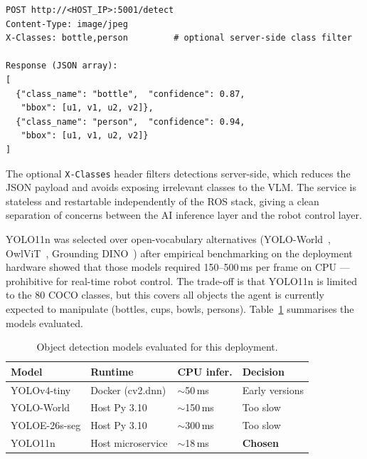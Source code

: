 \begin{lstlisting}[language={}, numbers=none,
    caption={YOLO11n microservice HTTP interface (port 5001).}]
POST http://<HOST_IP>:5001/detect
Content-Type: image/jpeg
X-Classes: bottle,person         # optional server-side class filter

Response (JSON array):
[
  {"class_name": "bottle",  "confidence": 0.87,
   "bbox": [u1, v1, u2, v2]},
  {"class_name": "person",  "confidence": 0.94,
   "bbox": [u1, v1, u2, v2]}
]
\end{lstlisting}

The optional \texttt{X-Classes} header filters detections server-side, which
reduces the JSON payload and avoids exposing irrelevant classes to the VLM.
The service is stateless and restartable independently of the ROS stack, giving
a clean separation of concerns between the AI inference layer and the robot
control layer.

\begin{sloppypar}
YOLO11n was selected over open-vocabulary alternatives
(YOLO-World~\cite{cheng2024yoloworld}, OwlViT~\cite{minderer2022owlvit},
Grounding DINO~\cite{liu2023gdino}) after empirical benchmarking on the
deployment hardware showed that those models required 150--500\,ms per frame
on CPU --- prohibitive for real-time robot control.
The trade-off is that YOLO11n is limited to the 80 COCO classes, but this
covers all objects the agent is currently expected to manipulate (bottles,
cups, bowls, persons).
Table~\ref{tab:yolo_micro} summarises the models evaluated.
\end{sloppypar}

\begin{table}[H]
\centering
\caption{Object detection models evaluated for this deployment.}
\label{tab:yolo_micro}
\small
\begin{tabular}{llll}
\toprule
\textbf{Model} & \textbf{Runtime} & \textbf{CPU infer.} & \textbf{Decision} \\
\midrule
YOLOv4-tiny   & Docker (cv2.dnn)  & $\sim$50\,ms  & Early versions \\
YOLO-World    & Host Py 3.10     & $\sim$150\,ms & Too slow \\
YOLOE-26s-seg & Host Py 3.10     & $\sim$300\,ms & Too slow \\
YOLO11n       & Host microservice & $\sim$18\,ms  & \textbf{Chosen} \\
\bottomrule
\end{tabular}
\normalsize
\end{table}


